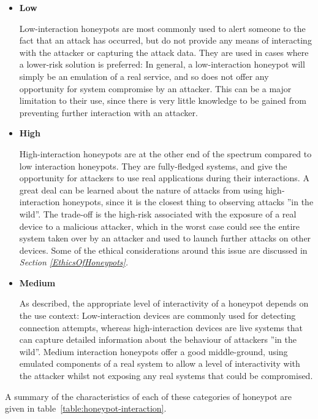 \begin{itemize}
	\item \textbf{Low}
	
	Low-interaction honeypots are most commonly used to alert someone to the fact that an attack has occurred, but do not provide any means of interacting with the attacker or capturing the attack data. They are used in cases where a lower-risk solution is preferred: In general, a low-interaction honeypot will simply be an emulation of a real service, and so does not offer any opportunity for system compromise by an attacker. This can be a major limitation to their use, since there is very little knowledge to be gained from preventing further interaction with an attacker.
	
	\item \textbf{High}
	
	High-interaction honeypots are at the other end of the spectrum compared to low interaction honeypots. They are fully-fledged systems, and give the opportunity for attackers to use real applications during their interactions. A great deal can be learned about the nature of attacks from using high-interaction honeypots, since it is the closest thing to observing attacks ''in the wild''. The trade-off is the high-risk associated with the exposure of a real device to a malicious attacker, which in the worst case could see the entire system taken over by an attacker and used to launch further attacks on other devices. Some of the ethical considerations around this issue are discussed in \textit{Section \ref{EthicsOfHoneypots}.}
	
	\item \textbf{Medium}
	
	As described, the appropriate level of interactivity of a honeypot depends on the use context: Low-interaction devices are commonly used for detecting connection attempts, whereas high-interaction devices are live systems that can capture detailed information about the behaviour of attackers ''in the wild''. Medium interaction honeypots offer a good middle-ground, using emulated components of a real system to allow a level of interactivity with the attacker whilst not exposing any real systems that could be compromised.
	
\end{itemize}

A summary of the characteristics of each of these categories of honeypot are given in table~\ref{table:honeypot-interaction}.

